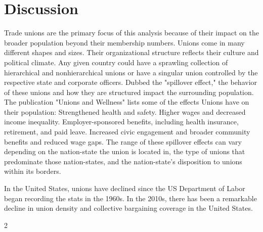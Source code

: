 \documentclass[11pt]{article}\usepackage[]{graphicx}\usepackage[]{xcolor}
\begin{document}
\section{Discussion}
\begin{multicols}{2}
Trade unions are the primary focus of this analysis because of their impact on the broader population beyond their membership numbers. Unions come in many different shapes and sizes. Their organizational structure reflects their culture and political climate. Any given country could have a sprawling collection of hierarchical and nonhierarchical unions or have a singular union controlled by the respective state and corporate officers. Dubbed the "spillover effect," the behavior of these unions and how they are structured impact the surrounding population. The publication "Unions and Wellness" lists some of the effects Unions have on their population: Strengthened health and safety. Higher wages and decreased income inequality. Employer-sponsored benefits, including health insurance, retirement, and paid leave. Increased civic engagement and broader community benefits and reduced wage gaps. The range of these spillover effects can vary depending on the nation-state the union is located in, the type of unions that predominate those nation-states, and the nation-state's disposition to unions within its borders.  

In the United States, unions have declined since the US Department of Labor began recording the stats in the 1960s. In the 2010s, there has been a remarkable decline in union density and collective bargaining coverage in the United States.
\end{multicols}{2}
\end{document}
